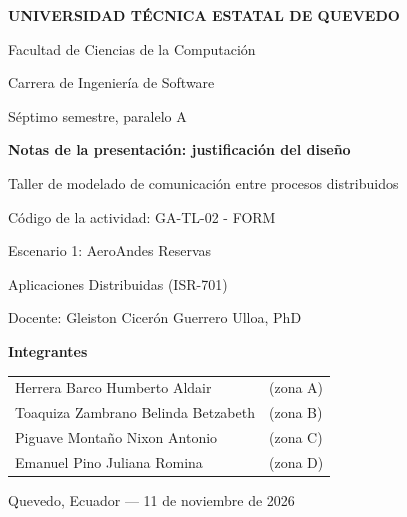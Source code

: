 \documentclass[11pt,a4paper]{article}
\newcommand{\integranteA}{Herrera Barco Humberto Aldair}
\newcommand{\integranteB}{Toaquiza Zambrano Belinda Betzabeth}
\newcommand{\integranteC}{Piguave Montaño Nixon Antonio}
\newcommand{\integranteD}{Emanuel Pino Juliana Romina}
\newcommand{\codigoactividad}{GA-TL-02 - FORM}
\begin{document}
\begin{titlepage}\centering
{\large\bfseries UNIVERSIDAD TÉCNICA ESTATAL DE QUEVEDO\par}\vspace{4pt}
Facultad de Ciencias de la Computación\par
Carrera de Ingeniería de Software\par
Séptimo semestre, paralelo A\par\vspace{2cm}
{\Large\bfseries Notas de la presentación: justificación del diseño\par}\vspace{6pt}
Taller de modelado de comunicación entre procesos distribuidos\par
Código de la actividad: \codigoactividad\par
Escenario 1: AeroAndes Reservas\par\vspace{1.5cm}
Aplicaciones Distribuidas (ISR-701)\par
Docente: Gleiston Cicerón Guerrero Ulloa, PhD\par\vspace{1.5cm}
{\bfseries Integrantes}\par\vspace{4pt}
\begin{tabular}{@{}ll@{}}
\integranteA & (zona A)\\ \integranteB & (zona B)\\
\integranteC & (zona C)\\ \integranteD & (zona D)\\
\end{tabular}\par\vfill
Quevedo, Ecuador --- 11 de noviembre de 2026\par
\end{titlepage}

\end{document}
